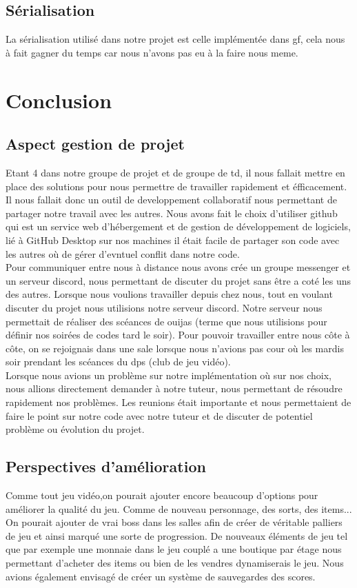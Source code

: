 \documentclass[a4paper, 12pt]{article}
\begin{document}
\subsection{Sérialisation}
La sérialisation utilisé dans notre projet est celle implémentée dans gf, cela nous à fait gagner du temps car nous n'avons pas eu à la faire nous meme.
\section{Conclusion}
\subsection{Aspect gestion de projet}
Etant 4 dans notre groupe de projet et de groupe de td, il nous fallait
mettre en place des solutions pour nous permettre de travailler rapidement et
éfficacement. Il nous fallait donc un outil de developpement collaboratif nous
permettant de partager notre travail avec les autres. Nous avons fait le choix
d’utiliser github qui est un service web d’hébergement et de gestion de
développement de logiciels, lié à GitHub Desktop sur nos machines il était
facile de partager son code avec les autres où de gérer d’evntuel conflit dans
notre code.\\ 

Pour communiquer entre nous à distance nous avons crée un groupe
messenger et un serveur discord, nous permettant de discuter du projet sans
être a coté les uns des autres. Lorsque nous voulions travailler depuis chez
nous, tout en voulant discuter du projet nous utilisions notre serveur discord.
Notre serveur nous permettait de réaliser des scéances de ouijas (terme que
nous utilisions pour définir nos soirées de codes tard le soir).
Pour pouvoir travailler entre nous côte à côte, on se rejoignais dans une sale
lorsque nous n’avions pas cour où les mardis soir prendant les scéances du dps
(club de jeu vidéo).\\

Lorsque nous avions un problème sur notre implémentation où sur nos
choix, nous allions directement demander à notre tuteur, nous permettant de
résoudre rapidement nos problèmes. Les reunions était importante et nous
permettaient de faire le point sur notre code avec notre tuteur et de discuter
de potentiel problème ou évolution du projet.\\
\newpage
\subsection{Perspectives d’amélioration}
Comme tout jeu vidéo,on pourait ajouter encore beaucoup d’options pour
améliorer la qualité du jeu. Comme de nouveau personnage, des sorts, des
items... On pourait ajouter de vrai boss dans les salles afin de créer de
véritable palliers de jeu et ainsi marqué une sorte de progression. De nouveaux
éléments de jeu tel que par exemple une monnaie dans le jeu couplé a une
boutique par étage nous permettant d’acheter des items ou bien de les vendres
dynamiserais le jeu. Nous avions également envisagé de créer un système de
sauvegardes des scores.
\end{document}
